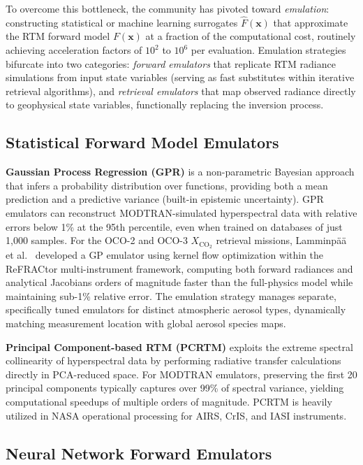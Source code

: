 \documentclass[11pt]{report}
\begin{document}
To overcome this bottleneck, the community has pivoted toward \emph{emulation}: constructing statistical or machine learning surrogates $\hat{F}(\mathbf{x})$ that approximate the RTM forward model $F(\mathbf{x})$ at a fraction of the computational cost, routinely achieving acceleration factors of $10^2$ to $10^6$ per evaluation. Emulation strategies bifurcate into two categories: \emph{forward emulators} that replicate RTM radiance simulations from input state variables (serving as fast substitutes within iterative retrieval algorithms), and \emph{retrieval emulators} that map observed radiance directly to geophysical state variables, functionally replacing the inversion process.

\subsection{Statistical Forward Model Emulators}

\textbf{Gaussian Process Regression (GPR)} is a non-parametric Bayesian approach that infers a probability distribution over functions, providing both a mean prediction and a predictive variance (built-in epistemic uncertainty). GPR emulators can reconstruct MODTRAN-simulated hyperspectral data with relative errors below 1\% at the 95th percentile, even when trained on databases of just 1,000 samples. For the OCO-2 and OCO-3 $X_{\text{CO}_2}$ retrieval missions, Lamminp\"a\"a et al.\ \cite{lamminpaa2025} developed a GP emulator using kernel flow optimization within the ReFRACtor multi-instrument framework, computing both forward radiances and analytical Jacobians orders of magnitude faster than the full-physics model while maintaining sub-1\% relative error. The emulation strategy manages separate, specifically tuned emulators for distinct atmospheric aerosol types, dynamically matching measurement location with global aerosol species maps.

\textbf{Principal Component-based RTM (PCRTM)} exploits the extreme spectral collinearity of hyperspectral data by performing radiative transfer calculations directly in PCA-reduced space. For MODTRAN emulators, preserving the first 20 principal components typically captures over 99\% of spectral variance, yielding computational speedups of multiple orders of magnitude. PCRTM is heavily utilized in NASA operational processing for AIRS, CrIS, and IASI instruments.

\subsection{Neural Network Forward Emulators}
\end{document}
